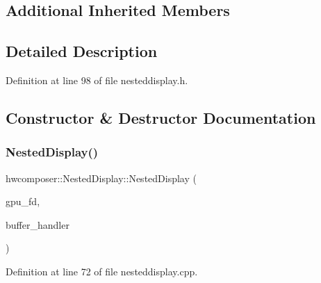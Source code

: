 \subsection*{Additional Inherited Members}


\subsection{Detailed Description}


Definition at line 98 of file nesteddisplay.\+h.



\subsection{Constructor \& Destructor Documentation}
\mbox{\label{classhwcomposer_1_1NestedDisplay_af672e7013e7a0c609a434ff995e41ead}} 
\subsubsection{\texorpdfstring{Nested\+Display()}{NestedDisplay()}}
{\footnotesize\ttfamily hwcomposer\+::\+Nested\+Display\+::\+Nested\+Display (\begin{DoxyParamCaption}\item[{uint32\+\_\+t}]{gpu\+\_\+fd,  }\item[{\mbox{\hyperlink{classhwcomposer_1_1NativeBufferHandler}{Native\+Buffer\+Handler}} $\ast$}]{buffer\+\_\+handler }\end{DoxyParamCaption})}



Definition at line 72 of file nesteddisplay.\+cpp.


